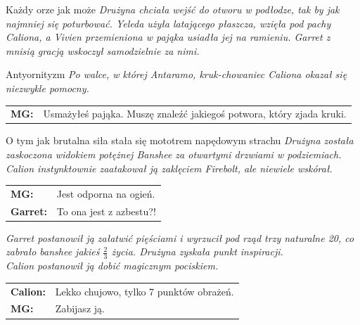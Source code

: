 \documentclass[10pt,twoside,twocolumn]{book}
\begin{document}
\begin{rpg-quotebox}{Każdy orze jak może}
   \textit{Drużyna chciała wejść do otworu w podłodze, tak by jak najmniej się poturbować. Yeleda użyła latającego płaszcza, wzięła pod pachy Caliona, a Vivien przemieniona w pająka usiadła jej na ramieniu. Garret z mnisią gracją wskoczył samodzielnie za nimi.}\\
\end{rpg-quotebox}


\begin{rpg-quotebox}{Antyornityzm}
   \textit{Po walce, w której Antaramo, kruk-chowaniec Caliona okazał się niezwykle pomocny.}\\
   \newline
   \begin{tabularx}{\columnwidth}{lX}
      \textbf{MG:} & Usmażyłeś pająka. Muszę znaleźć jakiegoś potwora, który zjada kruki.\\
   \end{tabularx}
\end{rpg-quotebox}


\begin{rpg-quotebox}{O tym jak brutalna siła stała się mototrem napędowym strachu}
   \textit{Drużyna została zaskoczona widokiem potężnej Banshee za otwartymi drzwiami w podziemiach. Calion instynktownie zaatakował ją zaklęciem Firebolt, ale niewiele wskórał.}\\
   \begin{tabularx}{\columnwidth}{lX}
      \textbf{MG:} & Jest odporna na ogień.\\
      \textbf{Garret:} & To ona jest z azbestu?!\\
   \end{tabularx}
   \textit{Garret postanowił ją załatwić pięściami i wyrzucił pod rząd trzy naturalne 20, co zabrało banshee jakieś $\frac{2}{3}$ życia. Drużyna zyskała punkt inspiracji.}\\
   \textit{Calion postanowił ją dobić magicznym pociskiem.}\\
   \begin{tabularx}{\columnwidth}{lX}
      \textbf{Calion:} & Lekko chujowo, tylko 7 punktów obrażeń.\\
      \textbf{MG:} & Zabijasz ją.\\
   \end{tabularx}
\end{rpg-quotebox}
\end{document}
